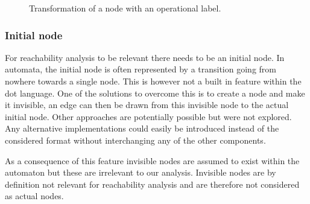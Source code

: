 \documentclass[12pt]{article}
\begin{document}
\begin{figure}[h]%
	\centering
	\qquad
	\caption{Transformation of a node with an operational label.}
	\label{fig:nodetransformlabel}
\end{figure}

\subsubsection{Initial node}
For reachability analysis to be relevant there needs to be an initial node. In automata, the initial node is often represented by a transition going from nowhere towards a single node. This is however not a built in feature within the dot language. One of the solutions to overcome this is to create a node and make it invisible, an edge can then be drawn from this invisible node to the actual initial node. Other approaches are potentially possible but were not explored. Any alternative implementations could easily be introduced instead of the considered format without interchanging any of the other components.

As a consequence of this feature invisible nodes are assumed to exist within the automaton but these are irrelevant to our analysis. Invisible nodes are by definition not relevant for reachability analysis and are therefore not considered as actual nodes.
\end{document}
